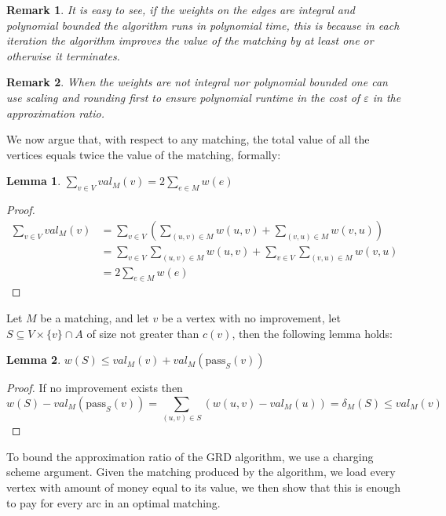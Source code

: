 \documentclass[draft]{article}
\newtheorem{lemma}{Lemma}
\newtheorem{remark}{Remark}
\begin{document}
\begin{remark}
It is easy to see, if the weights on the edges are integral and polynomial
bounded the algorithm runs in polynomial time, this is because in each iteration the
algorithm improves the value of the matching by at least one or otherwise it
terminates.
\end{remark}

\begin{remark}
When the weights are not integral nor polynomial bounded one can use scaling and
rounding first to ensure polynomial runtime in the cost of $\varepsilon$ in the
approximation ratio.
\end{remark}


We now argue that, with respect to any matching, 
the total value of all the vertices equals twice the value of the matching, 
formally: 
\begin{lemma}
\label{lm:val-twice}
$\sum_{v \in V} val_M(v) = 2 \sum_{e \in M} w(e)$
\end{lemma}

\begin{proof}
\begin{equation}
\begin{split}
\sum_{v \in V} val_M(v)	& = 
\sum_{v \in V} \left( \sum_{(u, v) \in M} w(u, v) + \sum_{(v, u) \in M} w(v, u) \right)	\\
						& = \sum_{v \in V}\sum_{(u, v) \in M} w(u, v) + 
							\sum_{v \in V}\sum_{(v, u) \in M} w(v, u)					\\
						& = 2 \sum_{e \in M} w(e)
\end{split}
\end{equation}
\end{proof}

Let $M$ be a matching, and let $v$ be a vertex with no improvement,
let $S \subseteq V \times \{v\} \cap A$ of size not greater than $c(v)$,
then the following lemma holds:

\begin{lemma}
\label{lm:no improve}
$w(S) \leq val_M(v) + val_M(\text{pass}_S(v))$
\end{lemma}

\begin{proof}
If no improvement exists then
$$
w(S) - val_M(\text{pass}_S(v))=
\sum_{(u,v) \in S}(w(u,v) - val_M(u)) =
\delta_M(S) 
\leq val_M(v)
$$
\end{proof}

To bound the approximation ratio of the GRD algorithm, 
we use a charging scheme argument.
Given the matching produced by the algorithm, 
we load every vertex with amount of money equal to its value,
we then show that this is enough to pay for every arc in an optimal matching.   
\end{document}
